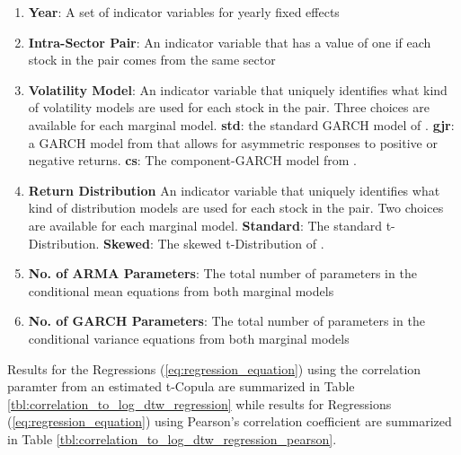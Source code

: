 \documentclass[12pt]{report}
\begin{document}
\begin{enumerate}
    \item \textbf{Year}: A set of indicator variables for yearly fixed effects
    \item \textbf{Intra-Sector Pair}: An indicator variable that has a value of one if each stock in the pair comes from the same sector
    \item \textbf{Volatility Model}: An indicator variable that uniquely identifies what kind of volatility models are used for each stock in the pair. Three choices are available for each marginal model. \textbf{std}: the standard GARCH model of \cite{Bollerslev1986Garch}. \textbf{gjr}: a GARCH model from \cite{GJR1993Garch} that allows for asymmetric responses to positive or negative returns. \textbf{cs}: The component-GARCH model from \cite{EngleLee1993APA}.
    \item \textbf{Return Distribution} An indicator variable that uniquely identifies what kind of distribution models are used for each stock in the pair. Two choices are available for each marginal model. \textbf{Standard}: The standard t-Distribution. \textbf{Skewed}: The skewed t-Distribution of \cite{FernandezSteel1998}.
    \item \textbf{No. of ARMA Parameters}: The total number of parameters in the conditional mean equations from both marginal models
    \item \textbf{No. of GARCH Parameters}: The total number of parameters in the conditional variance equations from both marginal models
\end{enumerate}

Results for the Regressions (\ref{eq:regression_equation}) using the correlation paramter from an estimated t-Copula are summarized in Table \ref{tbl:correlation_to_log_dtw_regression} while results for Regressions (\ref{eq:regression_equation}) using Pearson's correlation coefficient are summarized in Table \ref{tbl:correlation_to_log_dtw_regression_pearson}.
\end{document}
